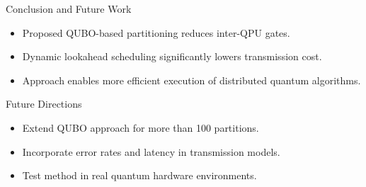 \documentclass{beamer}
\begin{document}
	\begin{frame}{Conclusion and Future Work}
		\begin{itemize}
			\item Proposed QUBO-based partitioning reduces inter-QPU gates.
			\item Dynamic lookahead scheduling significantly lowers transmission cost.
			\item Approach enables more efficient execution of distributed quantum algorithms.
		\end{itemize}
	\end{frame}
	
	\begin{frame}{Future Directions}
		\begin{itemize}
			\item Extend QUBO approach for more than 100 partitions.
			\item Incorporate error rates and latency in transmission models.
			\item Test method in real quantum hardware environments.
		\end{itemize}
	\end{frame}
	
	
	
	
\end{document}
